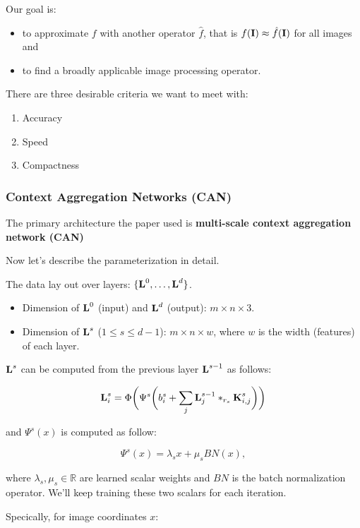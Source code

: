 \documentclass{article}
\newcommand{\tb}{\textbf}
\begin{document}
Our goal is:

\begin{itemize}
    \item to approximate $f$ with another operator $\hat f$, that is $f(\tb I) \approx \hat f(\tb I)$ for all images and
    \item to find a broadly applicable image processing operator.
\end{itemize}

There are three desirable criteria we want to meet with:

\begin{enumerate}
    \item Accuracy
    \item Speed
    \item Compactness
\end{enumerate}

\subsubsection*{Context Aggregation Networks (CAN)}

The primary architecture the paper used is \tb{multi-scale context aggregation network (CAN)}

Now let's describe the parameterization in detail.

The data lay out over layers: $\{\tb L^0, \dots, \tb L^d\}$.

\begin{itemize}
    \item Dimension of $\tb L^0$ (input) and $\tb L^d$ (output): $m \times n \times 3$.
    \item Dimension of $\tb L^s$ ($1 \le s \le d - 1$): $m \times n \times w$, where $w$ is the width (features) of each layer.
\end{itemize}

$\tb L^s$ can be computed from the previous layer $\tb L^{s - 1}$ as follows:

$$\tb L_i^s = \Phi\bigg( \Psi^s \bigg(b_i^s + \sum\limits_j \tb L_j^{s - 1} *_{r_s} \tb K_{i, j}^s \bigg)\bigg)$$

and $\Psi^s(x)$ is computed as follow:

$$\Psi^s(x) = \lambda_s x + \mu_s BN(x),$$

where $\lambda_s, \mu_s \in \mathbb R$ are learned scalar weights and $BN$ is the batch normalization operator. We'll keep training these two scalars for each iteration.

Specically, for image coordinates $x$:
\end{document}
